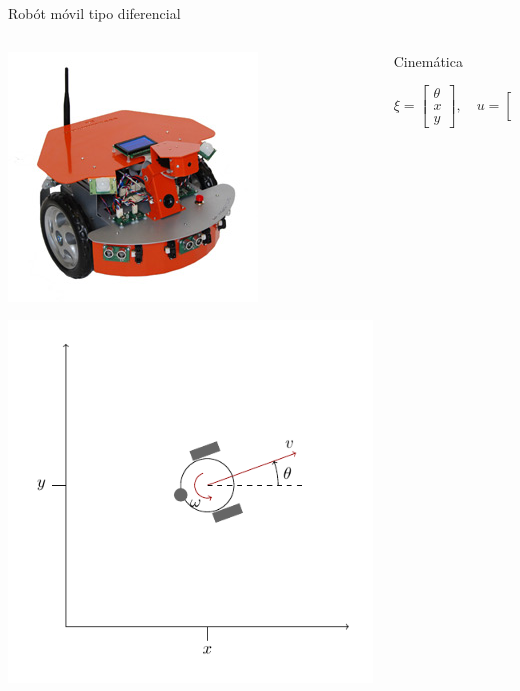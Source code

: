 \documentclass[presentation,aspectratio=169]{beamer}
\begin{document}
\begin{frame}[label={sec:orga452f6c}]{Robót móvil tipo diferencial}
\begin{columns}
\begin{column}{0.4\columnwidth}
\begin{center}
 \includegraphics[width=.3\linewidth]{../figures/X80Pro.jpg}
\end{center}
\begin{center}
 \includegraphics[width=1.0\linewidth]{../figures/unicycle-model}
\end{center}
\end{column}

\begin{column}{0.6\columnwidth}
\pause

\alert{Cinemática}

\[ \xi = \begin{bmatrix} \theta\\x\\y \end{bmatrix},   \quad u = \begin{bmatrix} \omega\\v \end{bmatrix}\]




\end{column}
\end{columns}
\end{frame}
\end{document}

